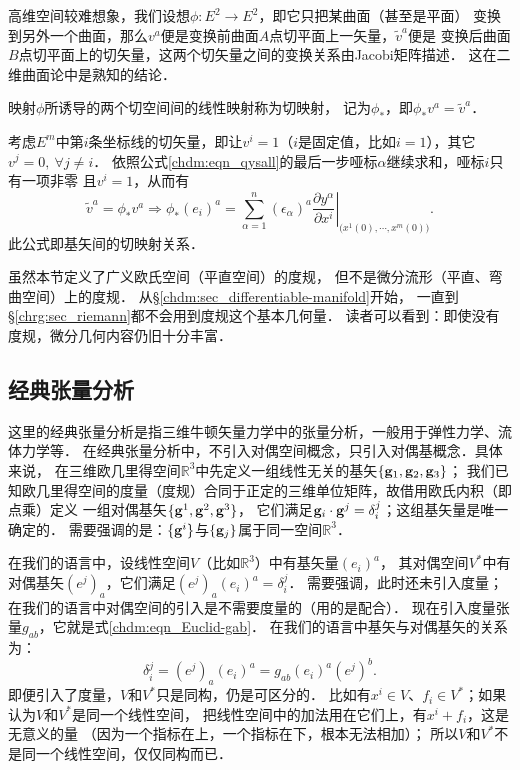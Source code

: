 高维空间较难想象，我们设想$\phi:E^2\to E^2$，即它只把某曲面（甚至是平面）
变换到另外一个曲面，那么$v^a$便是变换前曲面$A$点切平面上一矢量，$\tilde{v}^a$便是
变换后曲面$B$点切平面上的切矢量，这两个切矢量之间的变换关系由Jacobi矩阵描述．
这在二维曲面论中是熟知的结论． %

映射$\phi$所诱导的两个切空间间的线性映射称为{\heiti 切映射}，
记为$\phi_*$，即$\phi_* v^a = \tilde{v}^a$．

考虑$E^m$中第$i$条坐标线的切矢量，即让$v^i=1$（$i$是固定值，比如$i=1$），其它$v^j=0,\ \forall j\neq i$．
依照公式\eqref{chdm:eqn_qysall}的最后一步哑标$\alpha$继续求和，哑标$i$只有一项非零
且$v^i=1$，从而有
\begin{equation}
    \tilde{v}^a = \phi_* v^a \Rightarrow \phi_* (e_i)^a = \sum_{\alpha =1}^{n} (\epsilon_\alpha)^a  
     \left.\frac{\partial y^\alpha}{\partial x^i} \right|_{\bigl(x^1(0),\cdots,x^m(0)\bigr)} .
\end{equation}
此公式即基矢间的切映射关系．


虽然本节定义了广义欧氏空间（平直空间）的度规，
但不是微分流形（平直、弯曲空间）上的度规．
从\S\ref{chdm:sec_differentiable-manifold}开始，
一直到\S\ref{chrg:sec_riemann}都不会用到度规这个基本几何量．
读者可以看到：即使没有度规，微分几何内容仍旧十分丰富．

\subsection{经典张量分析}\label{chdm:sec_classical-tensor}

这里的{\kaishu 经典张量分析}是指三维牛顿矢量力学中的张量分析，一般用于弹性力学、流体力学等．
在经典张量分析中，不引入对偶空间概念，只引入对偶基概念．具体来说，
在三维欧几里得空间$\mathbb{R}^3$中先定义一组线性无关的基矢$\{{\bf g}_1, {\bf g}_2, {\bf g}_3\}$；
我们已知欧几里得空间的度量（度规）合同于正定的三维单位矩阵，故借用欧氏内积（即点乘）定义
一组对偶基矢$\{{\bf g}^1, {\bf g}^2, {\bf g}^3\}$，
它们满足${\bf g}_i \cdot {\bf g}^j =\delta _i^j$；这组基矢量是唯一确定的．
需要强调的是：{\kaishu $\{{\bf g}^i\}$与$\{{\bf g}_j\}$属于同一空间$\mathbb{R}^3$．}

在我们的语言中，设线性空间$V$（比如$\mathbb{R}^3$）中有基矢量$(e_i)^a$，
其对偶空间$V^*$中有对偶基矢$(e^j)_a$，它们满足$(e^j)_a (e_i)^a =\delta_i^j$．
需要强调，此时还未引入度量；在我们的语言中对偶空间的引入是不需要度量的（用的是{\kaishu 配合}）．
现在引入度量张量$g_{ab}$，它就是式\eqref{chdm:eqn_Euclid-gab}．
在我们的语言中基矢与对偶基矢的关系为：
\begin{equation}\label{chdm:tmp-Bedual}
    \delta_i^j =(e^j)_a (e_i)^a = g_{ab} (e_i)^a (e^j)^b  .
\end{equation}
即便引入了度量，$V$和$V^*$只是同构，仍是可区分的．
比如有$x^i \in V$、$f_i\in V^*$；如果认为$V$和$V^*$是同一个线性空间，
把线性空间中的{\kaishu 加法}用在它们上，有$x^i+f_i$，这是无意义的量
（因为一个指标在上，一个指标在下，根本无法相加）；
所以$V$和$V^*$不是同一个线性空间，仅仅同构而已．

